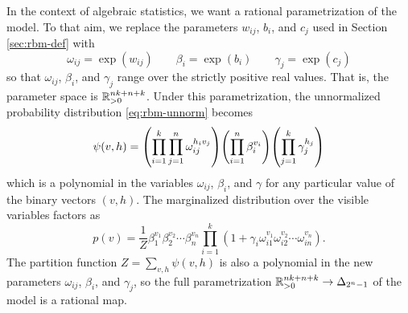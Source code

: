 \documentclass[cclicense]{hmcthesis}
\numberwithin{equation}{section}
\begin{document}
    In the context of algebraic statistics, we want a rational parametrization
    of the model.  To that aim, we replace the parameters $w_{ij}$, $b_i$, and
    $c_j$ used in Section \ref{sec:rbm-def} with
    \[
        \omega_{ij} = \exp(w_{ij})
        \qquad
        \beta_i = \exp(b_i)
        \qquad
        \gamma_j = \exp(c_j)
    \]
    so that $\omega_{ij}$, $\beta_i$, and $\gamma_j$ range over the strictly
    positive real values.  That is, the parameter space is $\mathbb{R}_{>0}^{nk+n+k}$.
    Under this parametrization, the unnormalized probability distribution
    \eqref{eq:rbm-unnorm} becomes
    \[
        \psi(v, h) = 
            \pdel*{ \prod_{i=1}^k \prod_{j=1}^n \omega_{ij}^{h_i v_j} }
            \pdel*{ \prod_{i=1}^n \beta_i^{v_i} }
            \pdel*{ \prod_{j=1}^k \gamma_j^{h_j} }
    \]
    which is a polynomial in the variables $\omega_{ij}$, $\beta_i$, and
    $\gamma$ for any particular value of the binary vectors $(v,h)$.  The
    marginalized distribution over the visible variables factors as
    \begin{equation} \label{eq:rbm-alg-par}
        p(v) = \frac 1 Z
        \beta_1^{v_1} \beta_2^{v_2} \cdots \beta_n^{v_n} 
        \prod_{i=1}^k
        (1 + \gamma_i \omega_{i1}^{v_1} \omega_{i2}^{v_2} \cdots
        \omega_{in}^{v_n}).
    \end{equation}
    The partition function $Z = \sum_{v,h} \psi(v,h)$ is also a polynomial in
    the new parameters $\omega_{ij}$, $\beta_i$, and $\gamma_j$,  so the full
    parametrization $\mathbb{R}_{>0}^{nk+n+k} \to \Delta_{2^n-1}$ of the model is a
    rational map.  
\end{document}
